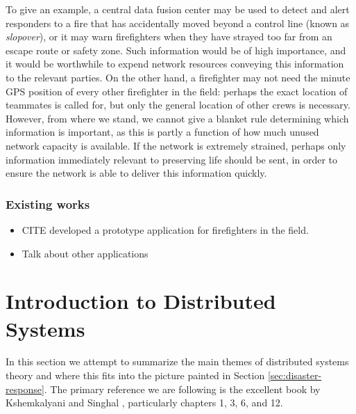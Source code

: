 \documentclass[]             %
{NASA}                       %
\theoremstyle{definition}
\providecommand{\tightlist}{%
  \setlength{\itemsep}{0pt}\setlength{\parskip}{0pt}}
\begin{document}
To give an example, a central data fusion center may be used to detect
and alert responders to a fire that has accidentally moved beyond a
control line (known as \emph{slopover}), or it may warn firefighters
when they have strayed too far from an escape route or safety
zone. Such information would be of high importance, and it would be
worthwhile to expend network resources conveying this information to
the relevant parties. On the other hand, a firefighter may not need
the minute GPS position of every other firefighter in the field:
perhaps the exact location of teammates is called for, but only the
general location of other crews is necessary. However, from where we
stand, we cannot give a blanket rule determining which information is
important, as this is partly a function of how much unused network
capacity is available. If the network is extremely strained, perhaps
only information immediately relevant to preserving life should be
sent, in order to ensure the network is able to deliver this
information quickly.


\subsubsection{Existing works}

\begin{itemize}
  \tightlist
\item
  CITE developed a prototype application for firefighters in the field.
\item
  Talk about other applications
\end{itemize}


\section{Introduction to Distributed Systems}
\label{sec:background}
In this section we attempt to summarize the main themes of distributed
systems theory and where this fits into the picture painted in Section
\ref{sec:disaster-response}. The primary reference we are following is
the excellent book by Kshemkalyani and Singhal
\cite{kshemkalyani_singhal_2008}, particularly chapters 1, 3, 6, and
12.
\end{document}
